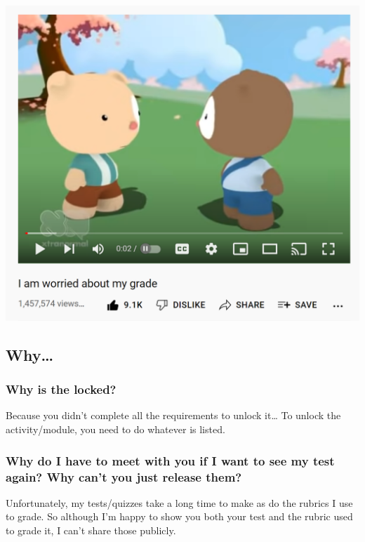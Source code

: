 \documentclass[
]{book}
\begin{document}
\includegraphics[width=18.14in]{img/worriedgrade}

\hypertarget{why}{%
\subsection{Why\ldots{}}\label{why}}

\hypertarget{why-is-the-locked}{%
\subsubsection{\texorpdfstring{Why is the locked?}{Why is the  locked?}}\label{why-is-the-locked}}

Because you didn't complete all the requirements to unlock it\ldots{} To unlock the activity/module, you need to do whatever is listed.

\hypertarget{why-do-i-have-to-meet-with-you-if-i-want-to-see-my-test-again-why-cant-you-just-release-them}{%
\subsubsection{Why do I have to meet with you if I want to see my test again? Why can't you just release them?}\label{why-do-i-have-to-meet-with-you-if-i-want-to-see-my-test-again-why-cant-you-just-release-them}}

Unfortunately, my tests/quizzes take a long time to make as do the rubrics I use to grade. So although I'm happy to show you both your test and the rubric used to grade it, I can't share those publicly.
\end{document}
